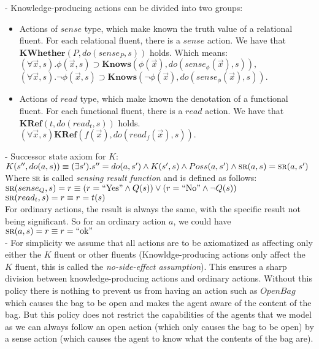 \documentclass[fleqn]{report}
\begin{document}
- Knowledge-producing actions can be divided into two groups:
\vspace{-.1cm} 
\begin{itemize}
\itemsep-.3em
 \item Actions of $sense$ type, which make known the truth value of a relational fluent. For each relational fluent, there is a $sense$ action. We have that $\textbf{KWhether}(P,do(sense_P,s))$ holds. Which means:\\
$(\forall \vec{x},s).\phi(\vec{x},s)\supset \textbf{Knows}(\phi(\vec{x}),do(sense_\phi(\vec{x}),s)),$\\
$(\forall \vec{x},s).\neg\phi(\vec{x},s)\supset \textbf{Knows}(\neg\phi(\vec{x}),do(sense_\phi(\vec{x}),s)).$
 \item Actions of $read$ type, which make known the denotation of a functional fluent. For each functional fluent, there is a $read$ action. We have that $\textbf{KRef}(t, do(read_t,s))$ holds.\\
$(\forall \vec{x},s)\textbf{KRef}(f(\vec{x}),do(read_f(\vec{x}),s)).$
\end{itemize}

- Successor state axiom for $K$:\\
$K(s'',do(a,s))\equiv(\exists s').s''=do(a,s')\land K(s',s)\land Poss(a,s')\land \textsc{sr}(a,s)=\textsc{sr}(a,s')$\\

Where \textsc{sr} is called \emph{sensing result function} and is defined as follows:\\

$\textsc{sr}(sense_Q,s)=r\equiv(r=\text{``Yes''}\land Q(s))\lor(r=\text{``No''}\land \neg Q(s))$\\
$\textsc{sr}(read_t,s)=r\equiv r=t(s)$\\
For ordinary actions, the result is always the same, with the specific result not being significant. So for an ordinary action $a$, we could have\\
$\textsc{sr}(a,s)=r\equiv r=\text{``ok''}$\\

- For simplicity we assume that all actions are to be axiomatized as affecting only either the $K$ fluent or other fluents (Knowldge-producing actions only affect the $K$ fluent, this is called the \emph{no-side-effect assumption}).
 This ensures a sharp division between knowledge-producing actions and ordinary actions.
 Without this policy there is nothing to prevent us from having an action such as $OpenBag$ which causes the bag to be open and makes the agent aware of the content of the bag. But this policy does not restrict 
the capabilities of the agents that we model as we can always follow an open action (which only causes the bag to be open) by a sense action (which causes the agent to know what the contents of the bag are).\\
\end{document}

